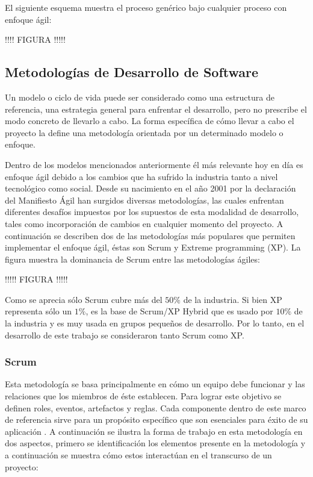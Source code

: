 El siguiente esquema muestra el proceso genérico bajo cualquier proceso con enfoque ágil:

!!!! FIGURA !!!!!

\subsection{Metodologías de Desarrollo de Software \label{sec:methodologies}}

Un modelo o ciclo de vida puede ser considerado como una estructura de referencia, una estrategia general para enfrentar el desarrollo, pero no prescribe el modo concreto de llevarlo a cabo. La forma específica de cómo llevar a cabo el proyecto la define una metodología orientada por un determinado modelo o enfoque.

Dentro de los modelos mencionados anteriormente él más relevante hoy en día es enfoque ágil debido a los cambios que ha sufrido la industria tanto a nivel tecnológico como social. Desde su nacimiento en el año 2001 por la declaración del Manifiesto Ágil han surgidos diversas metodologías, las cuales enfrentan diferentes desafíos impuestos por los supuestos de esta modalidad de desarrollo, tales como incorporación de cambios en cualquier momento del proyecto. A continuación se describen dos de las metodologías más populares que permiten implementar el enfoque ágil, éstas son Scrum y Extreme programming (XP). La figura muestra la dominancia de Scrum entre las metodologías ágiles:

!!!!!  FIGURA !!!!!

Como se aprecia sólo Scrum cubre más del $50\%$ de la industria. Si bien XP representa sólo un $1\%$, es la base de Scrum/XP Hybrid que es usado por $10\%$ de la industria y es muy usada en grupos pequeños de desarrollo. Por lo tanto, en el desarrollo de este trabajo se consideraron tanto Scrum como XP.

\subsubsection{Scrum \label{sec:scrum}}

Esta metodología se basa principalmente en cómo un equipo debe funcionar y las relaciones que los miembros de éste establecen. Para lograr este objetivo se definen roles, eventos, artefactos y reglas. Cada componente dentro de este marco de referencia sirve para un propósito específico que son esenciales para éxito de su aplicación \cite{scrum_guide}. A continuación se ilustra la forma de trabajo en esta metodología en dos aspectos, primero se identificación los elementos presente en la metodología y a continuación se muestra cómo estos interactúan en el transcurso de un proyecto:


